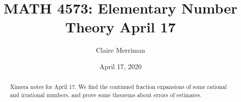 \documentclass{xourse}
\title{MATH 4573: Elementary Number Theory April 17}
\author{Claire Merriman}
\date{April 17, 2020}
\begin{document}
  
\begin{abstract} %
Ximera notes for April 17. We find the continued fraction expansions of some rational and irrational numbers, and prove some theorems about errors of estimates.

\end{abstract}  
\maketitle 
 
 
\end{document}
